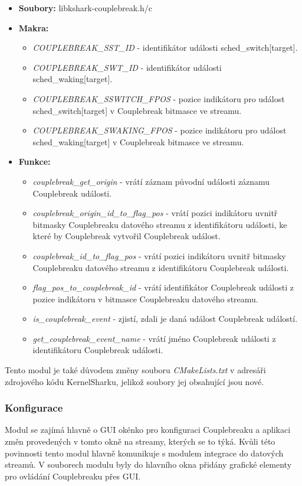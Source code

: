 \begin{itemize}
    \item \textbf{Soubory:} libkshark-couplebreak.h/c
    \item \textbf{Makra:}
    \begin{itemize}
        \item \emph{COUPLEBREAK\_SST\_ID} - identifikátor události sched\_switch[target].
        \item \emph{COUPLEBREAK\_SWT\_ID} - identifikátor události sched\_waking[target].
        \item \emph{COUPLEBREAK\_SSWITCH\_FPOS} - pozice indikátoru pro událost sched\_switch[target] v Couplebreak bitmasce ve streamu.
        \item \emph{COUPLEBREAK\_SWAKING\_FPOS} - pozice indikátoru pro událost sched\_waking[target] v Couplebreak bitmasce ve streamu.
    \end{itemize}
    \item \textbf{Funkce:}
    \begin{itemize}
        \item \emph{couplebreak\_get\_origin} - vrátí záznam původní události záznamu Couplebreak události.
        \item \emph{couplebreak\_origin\_id\_to\_flag\_pos} - vrátí pozici indikátoru uvnitř bitmasky Couplebreaku datového streamu z identifikátoru události, ke které by Couplebreak vytvořil Couplebreak událost.
        \item \emph{couplebreak\_id\_to\_flag\_pos} - vrátí pozici indikátoru uvnitř bitmasky Couplebreaku datového streamu z identifikátoru Couplebreak události.
        \item \emph{flag\_pos\_to\_couplebreak\_id} - vrátí identifikátor Couplebreak události z pozice indikátoru v bitmasce Couplebreaku datového streamu.
        \item \emph{is\_couplebreak\_event} - zjistí, zdali je daná událost Couplebreak událostí.
        \item \emph{get\_couplebreak\_event\_name} - vrátí jméno Couplebreak události z identifikátoru Couplebreak události. 
    \end{itemize}
\end{itemize}

Tento modul je také důvodem změny souboru \emph{CMakeLists.txt} v adresáři zdrojového kódu KernelSharku, jelikož soubory jej obsahující jsou nové.

\subsubsection*{Konfigurace}
Modul se zajímá hlavně o GUI okénko pro konfiguraci Couplebreaku a aplikaci změn provedených v tomto okně na streamy, kterých se to týká. Kvůli této povinnosti tento modul hlavně komunikuje s modulem integrace do datových streamů. V souborech modulu byly do hlavního okna přidány grafické elementy pro ovládání Couplebreaku přes GUI.

